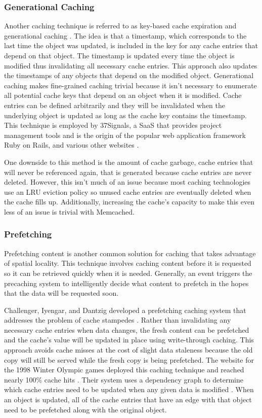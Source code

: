 \documentclass[12pt]{ucthesis}
\begin{document}
\subsubsection{Generational Caching}
Another caching technique is referred to as key-based cache expiration \cite{keyBasedCacheExpiration} and generational caching \cite{generationalCaching}.
The idea is that a timestamp, which corresponds to the last time the object was updated, is included in the key for any cache entries that depend on that object.
The timestamp is updated every time the object is modified thus invalidating all necessary cache entries.
This approach also updates the timestamps of any objects that depend on the modified object.
Generational caching makes fine-grained caching trivial because it isn't necessary to enumerate all potential cache keys that depend on an object when it is modified.
Cache entries can be defined arbitrarily and they will be invalidated when the underlying object is updated as long as the cache key contains the timestamp.
This technique is employed by \textsf{37Signals}, a SaaS that provides project management tools and is the origin of the popular web application framework Ruby on Rails\cite{37SignalsDotCom}, and various other websites \cite{keyBasedCacheExpiration}.

One downside to this method is the amount of cache garbage, cache entries that will never be referenced again, that is generated because cache entries are never deleted.
However, this isn't much of an issue because most caching technologies use an LRU eviction policy so unused cache entries are eventually deleted when the cache fills up.
Additionally, increasing the cache's capacity to make this even less of an issue is trivial with \textsf{Memcached}.

\subsubsection{Prefetching}
Prefetching content is another common solution for caching that takes advantage of spatial locality.
This technique involves caching content before it is requested so it can be retrieved quickly when it is needed.
Generally, an event triggers the precaching system to intelligently decide what content to prefetch in the hopes that the data will be requested soon.

Challenger, Iyengar, and Dantzig developed a prefetching caching system that addresses the problem of cache stampedes \cite{scalableConsistentCaching}.
Rather than invalidating any necessary cache entries when data changes, the fresh content can be prefetched and the cache's value will be updated in place using write-through caching.
This approach avoids cache misses at the cost of slight data staleness because the old copy will still be served while the fresh copy is being prefetched.
The website for the 1998 Winter Olympic games deployed this caching technique and reached nearly 100\% cache hits \cite{scalableConsistentCaching}.
Their system uses a dependency graph to determine which cache entries need to be updated when any given data is modified \cite{scalableConsistentCaching}.
When an object is updated, all of the cache entries that have an edge with that object need to be prefetched along with the original object.
\end{document}

